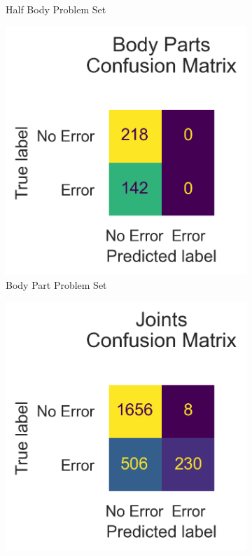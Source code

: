 \begin{figure}
\begin{subfigure}[b]{0.47\linewidth}
      \caption{Half Body Problem Set}
      \label{fig:hb_conf}
  \end{subfigure}
  \hfill
  \begin{subfigure}[b]{0.47\linewidth}
      \centering
      \includegraphics[width=\textwidth]{figures/Results/v2_bs_40_is_64_e_100/confusion/body_parts_together.png}
      \caption{Body Part Problem Set}
      \label{fig:bp_conf}
  \end{subfigure}
  \hfill
  \begin{subfigure}[b]{0.47\linewidth}
      \centering
      \includegraphics[width=\textwidth]{figures/Results/v2_bs_40_is_64_e_100/confusion/joints_together.png}

\end{subfigure}
\end{figure}

